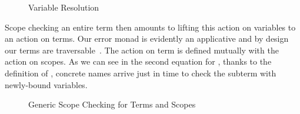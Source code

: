 \begin{figure}[h]
\caption{Variable Resolution}
\end{figure}

Scope checking an entire term then amounts to lifting this action on
variables to an action on terms. Our error monad  is evidently
an applicative and by design our terms are
traversable~\cite{bird_paterson_1999,DBLP:journals/jfp/GibbonsO09}.
The action on term is defined mutually with the action on scopes.
As we can see in the second equation for , thanks to the
definition of , concrete names arrive just in time to
check the subterm with newly-bound variables.

\begin{figure}[h]
\caption{Generic Scope Checking for Terms and Scopes}
\end{figure}
